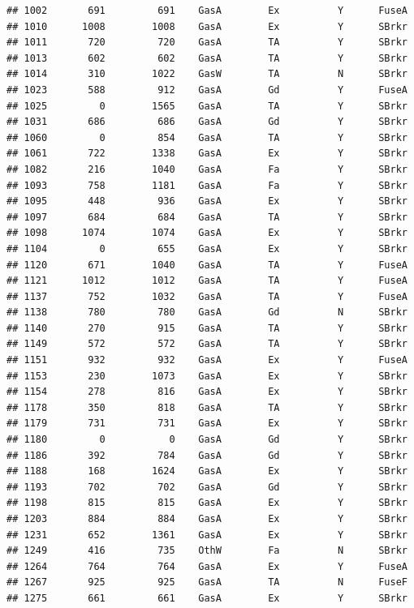 \documentclass[]{article}
\begin{document}
\begin{verbatim}
## 1002       691         691    GasA        Ex          Y      FuseA
## 1010      1008        1008    GasA        Ex          Y      SBrkr
## 1011       720         720    GasA        TA          Y      SBrkr
## 1013       602         602    GasA        TA          Y      SBrkr
## 1014       310        1022    GasW        TA          N      SBrkr
## 1023       588         912    GasA        Gd          Y      FuseA
## 1025         0        1565    GasA        TA          Y      SBrkr
## 1031       686         686    GasA        Gd          Y      SBrkr
## 1060         0         854    GasA        TA          Y      SBrkr
## 1061       722        1338    GasA        Ex          Y      SBrkr
## 1082       216        1040    GasA        Fa          Y      SBrkr
## 1093       758        1181    GasA        Fa          Y      SBrkr
## 1095       448         936    GasA        Ex          Y      SBrkr
## 1097       684         684    GasA        TA          Y      SBrkr
## 1098      1074        1074    GasA        Ex          Y      SBrkr
## 1104         0         655    GasA        Ex          Y      SBrkr
## 1120       671        1040    GasA        TA          Y      FuseA
## 1121      1012        1012    GasA        TA          Y      FuseA
## 1137       752        1032    GasA        TA          Y      FuseA
## 1138       780         780    GasA        Gd          N      SBrkr
## 1140       270         915    GasA        TA          Y      SBrkr
## 1149       572         572    GasA        TA          Y      SBrkr
## 1151       932         932    GasA        Ex          Y      FuseA
## 1153       230        1073    GasA        Ex          Y      SBrkr
## 1154       278         816    GasA        Ex          Y      SBrkr
## 1178       350         818    GasA        TA          Y      SBrkr
## 1179       731         731    GasA        Ex          Y      SBrkr
## 1180         0           0    GasA        Gd          Y      SBrkr
## 1186       392         784    GasA        Gd          Y      SBrkr
## 1188       168        1624    GasA        Ex          Y      SBrkr
## 1193       702         702    GasA        Gd          Y      SBrkr
## 1198       815         815    GasA        Ex          Y      SBrkr
## 1203       884         884    GasA        Ex          Y      SBrkr
## 1231       652        1361    GasA        Ex          Y      SBrkr
## 1249       416         735    OthW        Fa          N      SBrkr
## 1264       764         764    GasA        Ex          Y      FuseA
## 1267       925         925    GasA        TA          N      FuseF
## 1275       661         661    GasA        Ex          Y      SBrkr

\end{verbatim}
\end{document}
